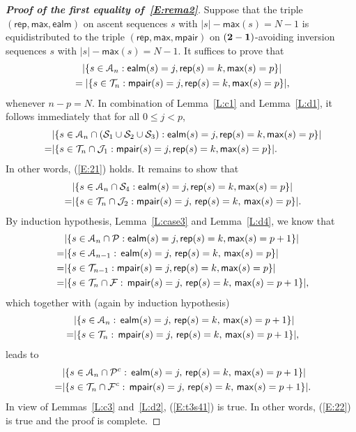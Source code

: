 \documentclass[12pt]{amsart}
\theoremstyle{plain}
\theoremstyle{definition}
\theoremstyle{example}
\theoremstyle{remark}
\numberwithin{equation}{section}
\numberwithin{figure}{section}
\def\max{\mathsf{max}}
\def\rep{\mathsf{rep}}
\def\ealm{\mathsf{ealm}}
\def\mpair{\mathsf{mpair}}
\def\A{\mathcal{A}}
\begin{document}
\begin{proof}[{\bf Proof of the first equality of~\eqref{E:rema2}}]
Suppose that the triple $(\rep,\max,\ealm)$ on ascent sequences $s$ with $|s|-\max(s)=N-1$ is equidistributed to the triple $(\rep,\max,\mpair)$ on $({\bf2-1})$-avoiding inversion sequences $s$ with $|s|-\max(s)=N-1$. It suffices to prove that
\begin{align*}
&\quad\vert\{s\in\A_n: \ealm(s)=j, \rep(s)=k, \max(s)=p\}\vert\\
&=\vert\{s\in\CMcal{T}_n:\mpair(s)=j, \rep(s)=k, \max(s)=p\}\vert,
\end{align*}
whenever $n-p=N$. In combination of Lemma~\ref{L:c1} and Lemma~\ref{L:d1}, it follows immediately that for all $0\le j<p$,
\begin{align*}
\,\quad &\vert\{s\in \A_n\cap(\CMcal{S}_1\cup\CMcal{S}_2\cup\CMcal{S}_3): \ealm(s)=j,\rep(s)=k, \max(s)=p\}\vert\\
=& \vert\{s\in \CMcal{T}_n\cap\CMcal{J}_1: \mpair(s)=j, \rep(s)=k, \max(s)=p\}\vert.
\end{align*}
In other words, (\ref{E:21}) holds. It remains to show that
\begin{align}\label{E:t3s41}
\,\quad &\vert\{s\in \A_n\cap\CMcal{S}_4:
 \ealm(s)=j,\rep(s)=k, \max(s)=p\}\vert\\
\nonumber=& \vert\{s\in \CMcal{T}_n\cap\CMcal{J}_2:
\mpair(s)=j,\,\rep(s)=k, \,\max(s)=p\}\vert.
\end{align}
By induction hypothesis, Lemma~\ref{L:case3} and Lemma~\ref{L:d4}, we know that
\begin{align*}
\,\quad &\vert\{s\in \A_n\cap \CMcal{P}:
\ealm(s)=j, \rep(s)=k, \max(s)=p+1\}\vert\\
\nonumber=& \vert\{s\in \A_{n-1}:
\,\ealm(s)=j,\,\rep(s)=k, \,\max(s)=p\}\vert\\
\nonumber=& \vert\{s\in \CMcal{T}_{n-1}:
\mpair(s)=j,\rep(s)=k, \max(s)=p\}\vert\\
\nonumber=&\vert\{s\in \CMcal{T}_n\cap \CMcal{F}:
\,\mpair(s)=j,\,\rep(s)=k, \,\max(s)=p+1\}\vert,
\end{align*}
which together with (again by induction hypothesis)
\begin{align*}
\,\quad &\vert\{s\in \A_n:
\,\ealm(s)=j,\,\rep(s)=k, \,\max(s)=p+1\}\vert\\
\nonumber=&\vert\{s\in \CMcal{T}_n:
\,\mpair(s)=j,\,\rep(s)=k, \,\max(s)=p+1\}\vert,
\end{align*}
leads to
\begin{align*}
\,\quad &\vert\{s\in \A_n\cap \CMcal{P}^c:
\,\ealm(s)=j,\,\rep(s)=k, \,\max(s)=p+1\}\vert\\
\nonumber=&\vert\{s\in \CMcal{T}_n\cap \CMcal{F}^c:
\,\mpair(s)=j,\,\rep(s)=k, \,\max(s)=p+1\}\vert.
\end{align*}
In view of Lemmas~\ref{L:c3} and~\ref{L:d2}, (\ref{E:t3s41}) is true. In other words, (\ref{E:22}) is true and the proof is complete.
\end{proof}
\end{document}

